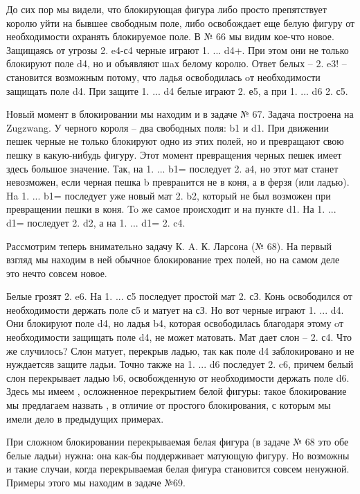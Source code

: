 До сих пор мы видели, что блокирующая фигура либо просто препятствует королю уйти на бывшее свободным поле, либо освобождает еще белую фигуру от необходимости охранять блокируемое поле. В № 66 мы видим кое-что новое. Защищаясь от угрозы 2. \rook{}e4-с4\mate{} черные играют 1. ... \bishop{}d4+. При этом они не только блокируют поле d4, но и объявляют шaх белому королю. Ответ белых -- 2. \rook{}e3\mate{}! -- становится возможным потому, что ладья освободилась oт необходимости защищать поле d4. При защите 1. ... \knight{}d4 белые играют 2. \rook{}е5\mate{}, а при 1. ... \knight{}d6 2. \rook{}с5\mate{}.

Новый момент в блокировании мы находим и в задаче № 67. Задача построена на Zugzwang. У черного короля -- два свободных поля: b1 и d1. При движении пешек черные не только блокируют одно из этих полей, но и превращают свою пешку в какую-нибудь фигуру. Этот момент превращения черных пешек имеет здесь большое значение. Так, на 1. ... b1=\knight{} последует 2. \queen{}а4\mate{}, но этот мат станет невозможен, если черная пешка b превраnится не в коня, а в ферзя (или ладью). Ha 1. ... b1=\queen{} последует уже новый мат 2. \knight{}b2\mate{}, который не был возможен при превращении пешки в коня. To же самое происходит и на пункте d1. На 1. ... d1=\queen{} последует 2. \knight{}d2\mate{}, а на 1. ... d1=\knight{} 2. \queen{}c4\mate{}.

Рассмотрим теперь внимательно задачу К. A. К. Ларсона (№ 68). На первый взгляд мы находим в ней обычное блокирование трех полей, но на самом деле это нечто совсем новое.

Белые грозят 2. \queen{}e6\mate{}. На 1. ... \knight{}с5 последует простой мат 2. \knight{}сЗ\mate{}. Конь освободился от необходимости держать поле с5 и матует на сЗ. Но вот черные играют 1. ... \knight{}d4. Они блокируют поле d4, но ладья b4, которая освободилась благодаря этому oт необходимости защищать поле d4, не может матовать. Мат дает слон -- 2. \bishop{}с4\mate{}. Что же случилось? Слон матует, перекрыв ладью, так как поле d4 заблокировано и не нуждаетсяв защите ладьи. Точно также на 1. ... \bishop{}d6 последует 2. \bishop{}c6\mate{}, причем белый слон перекрывает ладью b6, освобожденную от необходимости держать поле d6. Здесь мы имеем , осложненное перекрытием белой фигуры: такое блокирование мы предлагаем назвать , в отличие от простого блокирования, с которым мы имели дело в предыдущих примерах.

При сложном блокировании перекрываемая белая фигура (в задаче № 68 это обе белые ладьи) нужна: она как-бы поддерживает матующую фигуру. Но возможны и такие случаи, когда перекрываемая белая фигура становится совсем ненужной. Примеры этого мы находим в задаче №69.


